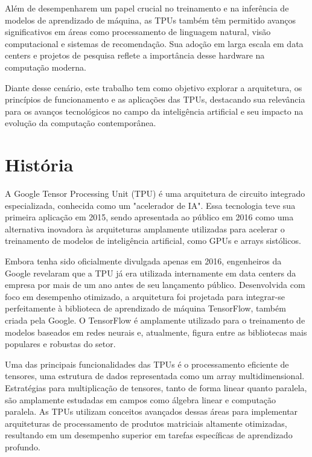 \documentclass{report}
\begin{document}
Além de desempenharem um papel crucial no treinamento e na inferência de modelos de aprendizado de máquina, as TPUs também têm permitido avanços significativos em áreas como processamento de linguagem natural, visão computacional e sistemas de recomendação. Sua adoção em larga escala em data centers e projetos de pesquisa reflete a importância desse hardware na computação moderna.

Diante desse cenário, este trabalho tem como objetivo explorar a arquitetura, os princípios de funcionamento e as aplicações das TPUs, destacando sua relevância para os avanços tecnológicos no campo da inteligência artificial e seu impacto na evolução da computação contemporânea.

\chapter{História}

\setlength{\parskip}{1em}\hspace{0.5cm} A Google Tensor Processing Unit (TPU) é uma arquitetura de circuito integrado especializada, conhecida como um "acelerador de IA". Essa tecnologia teve sua primeira aplicação em 2015, sendo apresentada ao público em 2016 como uma alternativa inovadora às arquiteturas amplamente utilizadas para acelerar o treinamento de modelos de inteligência artificial, como GPUs e arrays sistólicos.

Embora tenha sido oficialmente divulgada apenas em 2016, engenheiros da Google revelaram que a TPU já era utilizada internamente em data centers da empresa por mais de um ano antes de seu lançamento público. Desenvolvida com foco em desempenho otimizado, a arquitetura foi projetada para integrar-se perfeitamente à biblioteca de aprendizado de máquina TensorFlow, também criada pela Google. O TensorFlow é amplamente utilizado para o treinamento de modelos baseados em redes neurais e, atualmente, figura entre as bibliotecas mais populares e robustas do setor.

Uma das principais funcionalidades das TPUs é o processamento eficiente de tensores, uma estrutura de dados representada como um array multidimensional. Estratégias para multiplicação de tensores, tanto de forma linear quanto paralela, são amplamente estudadas em campos como álgebra linear e computação paralela. As TPUs utilizam conceitos avançados dessas áreas para implementar arquiteturas de processamento de produtos matriciais altamente otimizadas, resultando em um desempenho superior em tarefas específicas de aprendizado profundo.
\end{document}
